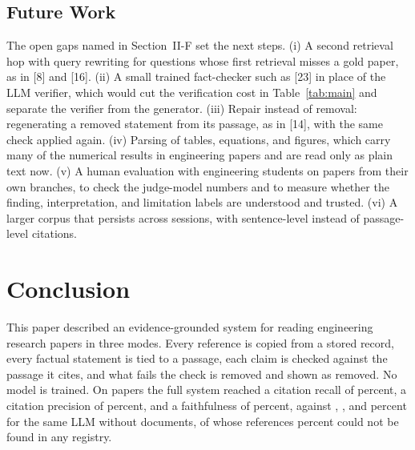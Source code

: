 \documentclass[10pt,twocolumn,letterpaper]{article}
\begin{document}
\subsection{Future Work}
The open gaps named in Section~II-F set the next steps. (i) A second retrieval hop with query rewriting for questions whose first retrieval misses a gold paper, as in [8] and [16]. (ii) A small trained fact-checker such as [23] in place of the LLM verifier, which would cut the verification cost in Table~\ref{tab:main} and separate the verifier from the generator. (iii) Repair instead of removal: regenerating a removed statement from its passage, as in [14], with the same check applied again. (iv) Parsing of tables, equations, and figures, which carry many of the numerical results in engineering papers and are read only as plain text now. (v) A human evaluation with engineering students on papers from their own branches, to check the judge-model numbers and to measure whether the finding, interpretation, and limitation labels are understood and trusted. (vi) A larger corpus that persists across sessions, with sentence-level instead of passage-level citations.

\section{Conclusion}
This paper described an evidence-grounded system for reading engineering research papers in three modes. Every reference is copied from a stored record, every factual statement is tied to a passage, each claim is checked against the passage it cites, and what fails the check is removed and shown as removed. No model is trained. On \ResNPapers{} papers the full system reached a citation recall of \ResCRver{} percent, a citation precision of \ResCPver{} percent, and a faithfulness of \ResFAver{} percent, against \ResCRbase{}, \ResCPbase{}, and \ResFAbase{} percent for the same LLM without documents, of whose references \ResRefFabPct{} percent could not be found in any registry.
\end{document}
